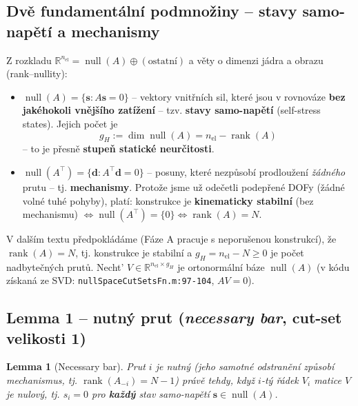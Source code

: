 \documentclass[11pt,a4paper]{article}
\newtheorem{lemma}{Lemma}
\newcommand{\R}{\mathbb{R}}
\newcommand{\code}[1]{\texttt{#1}}
\newcommand{\rank}{\operatorname{rank}}
\begin{document}
\subsection{Dvě fundamentální podmnožiny -- stavy samo-napětí a mechanismy}

Z rozkladu $\R^{n_{\mathrm{el}}} = \operatorname{null}(A)\oplus(\text{ostatní})$ a věty o dimenzi
jádra a obrazu (rank--nullity):

\begin{itemize}
  \item $\operatorname{null}(A) = \{\mathbf s : A\mathbf s = 0\}$ -- vektory vnitřních sil, které jsou
        v rovnováze \textbf{bez jakéhokoli vnějšího zatížení} -- tzv. \textbf{stavy samo-napětí}
        (self-stress states). Jejich počet je
        \[
          g_H := \dim\operatorname{null}(A) = n_{\mathrm{el}} - \rank(A)
        \]
        -- to je přesně \textbf{stupeň statické neurčitosti}.
  \item $\operatorname{null}(A^\top) = \{\mathbf d: A^\top\mathbf d=0\}$ -- posuny, které nezpůsobí
        prodloužení \emph{žádného} prutu -- tj. \textbf{mechanismy}. Protože jsme už odečetli podepřené
        DOFy (žádné volné tuhé pohyby), platí: konstrukce je \textbf{kinematicky stabilní} (bez
        mechanismu) $\iff \operatorname{null}(A^\top)=\{0\} \iff \rank(A) = N$.
\end{itemize}

V dalším textu předpokládáme (Fáze A pracuje s neporušenou konstrukcí), že $\rank(A)=N$, tj. konstrukce
je stabilní a $g_H = n_{\mathrm{el}}-N \geq 0$ je počet nadbytečných prutů. Necht' $V\in\R^{n_{\mathrm{el}}
\times g_H}$ je ortonormální báze $\operatorname{null}(A)$ (v kódu získaná ze SVD:
\code{nullSpaceCutSetsFn.m:97-104}, $AV=0$).

\subsection{Lemma 1 -- nutný prut (\emph{necessary bar}, cut-set velikosti 1)}

\begin{lemma}[Necessary bar]
Prut $i$ je \emph{nutný} (jeho samotné odstranění způsobí mechanismus, tj. $\rank(A_{-i}) = N-1$)
právě tehdy, když $i$-tý řádek $V_i$ matice $V$ je nulový, tj. $s_i = 0$ pro \textbf{každý} stav
samo-napětí $\mathbf s\in\operatorname{null}(A)$.
\end{lemma}
\end{document}
